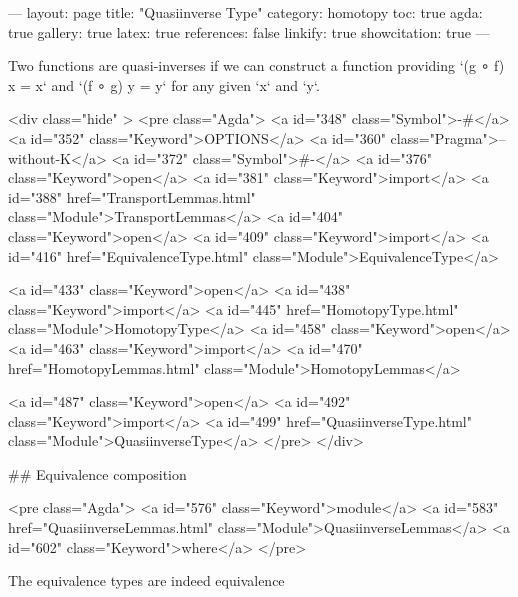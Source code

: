---
layout: page
title: "Quasiinverse Type"
category: homotopy
toc: true
agda: true
gallery: true
latex: true
references: false
linkify: true
showcitation: true
---

Two functions are quasi-inverses if we can construct a function providing
`(g ∘ f) x = x` and `(f ∘ g) y = y` for any given `x` and `y`.

<div class="hide" >
<pre class="Agda">
<a id="348" class="Symbol">{-#</a> <a id="352" class="Keyword">OPTIONS</a> <a id="360" class="Pragma">--without-K</a> <a id="372" class="Symbol">#-}</a>
<a id="376" class="Keyword">open</a> <a id="381" class="Keyword">import</a> <a id="388" href="TransportLemmas.html" class="Module">TransportLemmas</a>
<a id="404" class="Keyword">open</a> <a id="409" class="Keyword">import</a> <a id="416" href="EquivalenceType.html" class="Module">EquivalenceType</a>

<a id="433" class="Keyword">open</a> <a id="438" class="Keyword">import</a> <a id="445" href="HomotopyType.html" class="Module">HomotopyType</a>
<a id="458" class="Keyword">open</a> <a id="463" class="Keyword">import</a> <a id="470" href="HomotopyLemmas.html" class="Module">HomotopyLemmas</a>


<a id="487" class="Keyword">open</a> <a id="492" class="Keyword">import</a> <a id="499" href="QuasiinverseType.html" class="Module">QuasiinverseType</a>
</pre>
</div>

## Equivalence composition

<pre class="Agda">
<a id="576" class="Keyword">module</a> <a id="583" href="QuasiinverseLemmas.html" class="Module">QuasiinverseLemmas</a> <a id="602" class="Keyword">where</a>
</pre>

The equivalence types are indeed equivalence

